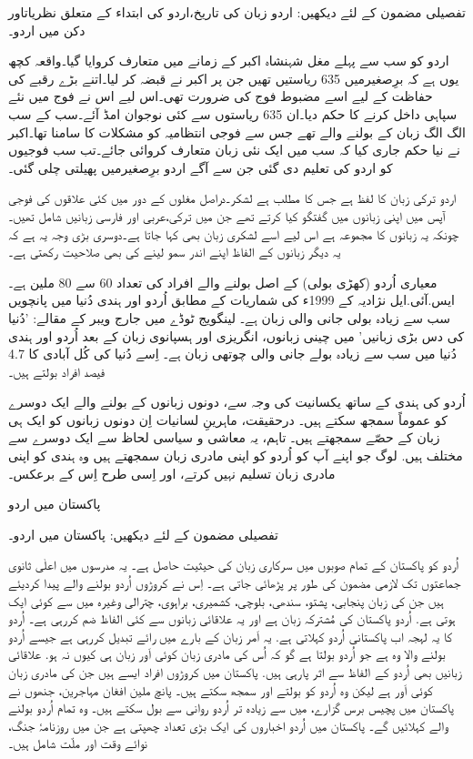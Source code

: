 \documentclass[a4paper]{article}
\begin{document}
تفصیلی مضمون کے لئے دیکھیں: اردو زبان کی تاریخ،اردو کی ابتداء کے متعلق نظریاتاور دکن میں اردو۔

اردو کو سب سے پہلے مغل شہنشاہ اکبر کے زمانے میں متعارف کروایا گیا۔واقعہ کچھ یوں ہے کہ برِصغیرمیں 635 ریاستیں تھیں جن پر اکبر نے قبضہ کر لیا۔اتنے بڑے رقبے کی حفاظت کے لیے اسے مضبوط فوج کی ضرورت تھی۔اس لیے اس نے فوج میں نئے سپاہی داخل کرنے کا حکم دیا۔ان 635 ریاستوں سے کئی نوجوان امڈ آئے۔سب کے سب الگ الگ زبان کے بولنے والے تھے جس سے فوجی انتظامیہ کو مشکلات کا سامنا تھا۔اکبر نے نیا حکم جاری کیا کہ سب میں ایک نئی زبان متعارف کروائی جائے۔تب سب فوجیوں کو اردو کی تعلیم دی گئی جن سے آگے اردو برِصغیرمیں پھیلتی چلی گئی۔

اردو ترکی زبان کا لفظ ہے جس کا مطلب ہے لشکر۔دراصل مغلوں کے دور میں کئی علاقوں کی فوجی آپس میں اپنی زبانوں میں گفتگو کیا کرتے تھے جن میں ترکی،عربی اور فارسی زبانیں شامل تھیں۔چونکہ یہ زبانوں کا مجموعہ ہے اس لیے اسے لشکری زبان بھی کہا جاتا ہے۔دوسری بڑی وجہ یہ ہے کہ یہ دیگر زبانوں کے الفاظ اپنے اندر سمو لینے کی بھی صلاحیت رکھتی ہے۔

معیاری اُردو (کھڑی بولی) کے اصل بولنے والے افراد کی تعداد 60 سے 80 ملین ہے۔ ایس.آئی.ایل نژادیہ کے 1999ء کی شماریات کے مطابق اُردو اور ہندی دُنیا میں پانچویں سب سے زیادہ بولی جانی والی زبان ہے۔ لینگویج ٹوڈے میں جارج ویبر کے مقالے: 'دُنیا کی دس بڑی زبانیں' میں چینی زبانوں، انگریزی اور ہسپانوی زبان کے بعد اُردو اور ہندی دُنیا میں سب سے زیادہ بولے جانی والی چوتھی زبان ہے۔ اِسے دُنیا کی کُل آبادی کا 4.7 فیصد افراد بولتے ہیں۔

اُردو کی ہندی کے ساتھ یکسانیت کی وجہ سے، دونوں زبانوں کے بولنے والے ایک دوسرے کو عموماً سمجھ سکتے ہیں۔ درحقیقت، ماہرینِ لسانیات اِن دونوں زبانوں کو ایک ہی زبان کے حصّے سمجھتے ہیں۔ تاہم، یہ معاشی و سیاسی لحاظ سے ایک دوسرے سے مختلف ہیں. لوگ جو اپنے آپ کو اُردو کو اپنی مادری زبان سمجھتے ہیں وہ ہندی کو اپنی مادری زبان تسلیم نہیں کرتے، اور اِسی طرح اِس کے برعکس۔

پاکستان میں اردو

تفصیلی مضمون کے لئے دیکھیں: پاکستان میں اردو۔

اُردو کو پاکستان کے تمام صوبوں میں سرکاری زبان کی حیثیت حاصل ہے۔ یہ مدرسوں میں اعلٰی ثانوی جماعتوں تک لازمی مضمون کی طور پر پڑھائی جاتی ہے۔ اِس نے کروڑوں اُردو بولنے والے پیدا کردیئے ہیں جن کی زبان پنجابی، پشتو، سندھی، بلوچی، کشمیری، براہوی، چترالی وغیرہ میں سے کوئی ایک ہوتی ہے. اُردو پاکستان کی مُشترکہ زبان ہے اور یہ علاقائی زبانوں سے کئی الفاظ ضم کررہی ہے۔ اُردو کا یہ لہجہ اب پاکستانی اُردو کہلاتی ہے. یہ اَمر زبان کے بارے میں رائے تبدیل کررہی ہے جیسے اُردو بولنے والا وہ ہے جو اُردو بولتا ہے گو کہ اُس کی مادری زبان کوئی اَور زبان ہی کیوں نہ ہو. علاقائی زبانیں بھی اُردو کے الفاظ سے اثر پارہی ہیں. پاکستان میں کروڑوں افراد ایسے ہیں جن کی مادری زبان کوئی اَور ہے لیکن وہ اُردو کو بولتے اور سمجھ سکتے ہیں۔ پانچ ملین افغان مہاجرین، جنھوں نے پاکستان میں پچیس برس گزارے، میں سے زیادہ تر اُردو روانی سے بول سکتے ہیں۔ وہ تمام اُردو بولنے والے کہلائیں گے۔ پاکستان میں اُردو اخباروں کی ایک بڑی تعداد چھپتی ہے جن میں روزنامۂ جنگ، نوائے وقت اور ملّت شامل ہیں۔
\end{document}
